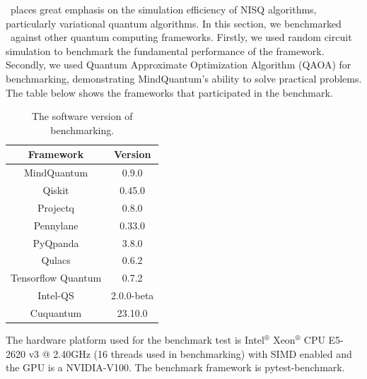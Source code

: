 \MindQuantum\ places great emphasis on the simulation efficiency of NISQ algorithms, particularly variational quantum algorithms. In this section, we benchmarked \MindQuantum\ against other quantum computing frameworks. Firstly, we used random circuit simulation to benchmark the fundamental performance of the framework. Secondly, we used Quantum Approximate Optimization Algorithm (QAOA) for benchmarking, demonstrating MindQuantum's ability to solve practical problems. The table below shows the frameworks that participated in the benchmark.

\begin{table}[ht]
    \begin{tabular}{cc}
        \toprule
        Framework          & Version    \\
        \midrule
        MindQuantum        & 0.9.0      \\
        Qiskit             & 0.45.0     \\
        Projectq           & 0.8.0      \\
        Pennylane          & 0.33.0     \\
        PyQpanda           & 3.8.0      \\
        Qulacs             & 0.6.2      \\
        Tensorflow Quantum & 0.7.2      \\
        Intel-QS           & 2.0.0-beta \\
        Cuquantum          & 23.10.0    \\
        \bottomrule
    \end{tabular}
    \caption{The software version of benchmarking.}
    \label{tab:software version}
\end{table}

The hardware platform used for the benchmark test is Intel$^\circledR$ Xeon$^\circledR$ CPU E5-2620 v3 @ 2.40GHz (16 threads used in benchmarking) with SIMD enabled and the GPU is a NVIDIA-V100. The benchmark framework is pytest-benchmark.

